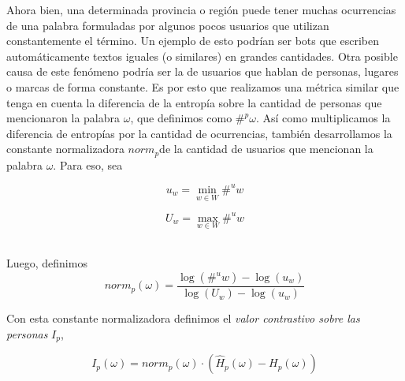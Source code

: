 Ahora bien, una determinada provincia o región puede tener muchas ocurrencias de una palabra formuladas por algunos pocos usuarios que utilizan constantemente el término. Un ejemplo de esto podrían ser bots que escriben automáticamente textos iguales (o similares) en grandes cantidades. Otra posible causa de este fenómeno podría ser la de usuarios que hablan de personas, lugares o marcas de forma constante.
Es por esto que realizamos una métrica similar que tenga en cuenta la diferencia de la entropía sobre la cantidad de personas que mencionaron la palabra $\omega$, que definimos como $\#^p \omega$. Así como multiplicamos la diferencia de entropías por la cantidad de ocurrencias, también desarrollamos la constante normalizadora $norm_p$de la cantidad de usuarios que mencionan la palabra $\omega$. 
Para eso, sea %

\noindent\begin{minipage}{.5\linewidth}
\begin{equation}
  u_w = \min \limits_{w \in W} \#^u w
\end{equation}
\end{minipage}%
\begin{minipage}{.5\linewidth}
\begin{equation}
  U_w = \max \limits_{w \in W} \#^u w
\end{equation}
\end{minipage}\\

Luego, definimos
\begin{equation}
norm_p(\omega) = \frac{\log\left(\#^u w\right) - \log \left(u_w\right)}{\log\left(U_w\right) - \log\left(u_w\right)}  
\label{eq:norm2}
\end{equation}

Con esta constante normalizadora definimos el \textit{valor contrastivo sobre las personas} $I_p$,

\begin{equation}
I_p(\omega) = norm_p(\omega) \cdot (\widehat{H}_p(\omega) - H_p(\omega))
\label{eq:iu}
\end{equation}


